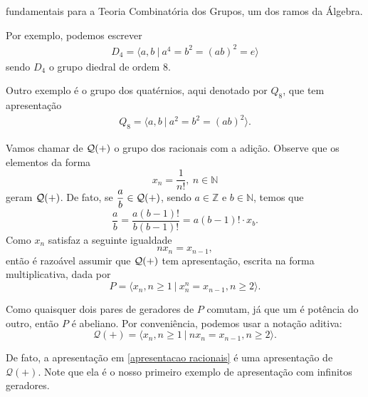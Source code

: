 	fundamentais para a Teoria Combinatória dos Grupos, um dos ramos da Álgebra.
	\begin{example}
	Por exemplo, podemos escrever 
	\begin{align}
	\label{apresentacao d4}
	    D_4 = \langle a,b \ | \ a^4 = b^2 = (ab)^2 = e \rangle
	\end{align}
	sendo $D_4$ o grupo diedral de ordem $8$.
	\end{example}
	\begin{example}
	Outro exemplo é o grupo dos quatérnios, aqui denotado por $Q_8$, que tem apresentação
	\begin{align}
	\label{apresentacao quaternios}
	    Q_8 = \langle a,b \ | \ a^2=b^2=(ab)^2 \rangle.
	\end{align}
	\end{example}
	\begin{example}
	Vamos chamar de $\cal{Q}(+)$ o grupo dos racionais com a adição. 
	Observe que os elementos da forma
	\begin{equation*}
	    x_n = \frac{1}{n!}, \ n\in\mathbb{N}
	\end{equation*}
	geram $\cal{Q}(+)$. De fato, se $\displaystyle{ \frac{a}{b}\in\cal{Q}(+) }$, 
	sendo $a\in\mathbb{Z}$ e $b\in\mathbb{N}$, temos que
	\begin{equation*}
	    \frac{a}{b} = \frac{a(b-1)!}{b(b-1)!} = a(b-1)!\cdot x_b.
	\end{equation*}
	Como $x_n$ satisfaz a seguinte igualdade
	\begin{equation*}
	    nx_n = x_{n-1},
	\end{equation*}
	então é razoável assumir que $\cal{Q}(+)$ tem apresentação, escrita na forma
	multiplicativa, dada por
	\begin{equation*}
	    P = \langle x_n, n\geq 1 \ | \ x_n^n = x_{n-1}, n\geq 2 \rangle.
	\end{equation*}
	\par\vspace{0.3cm} Como quaisquer dois pares de geradores de $P$ comutam, já que um é potência do outro, 
	então $P$ é abeliano. Por conveniência, podemos usar a notação aditiva:
	\begin{equation}
	\label{apresentacao racionais}
	    \mathcal{Q}(+) = \langle x_n, n\geq 1 \ | \ nx_n = x_{n-1}, n\geq 2 \rangle.
	\end{equation}
	\par\vspace{0.3cm} De fato, a apresentação em \eqref{apresentacao racionais} é uma apresentação de
	$\mathcal{Q}(+)$. Note que ela é o nosso primeiro exemplo de apresentação com infinitos geradores.
	\end{example}

